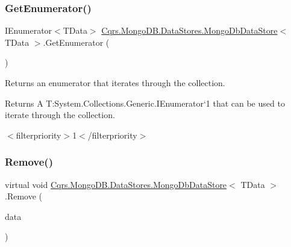\mbox{\label{classCqrs_1_1MongoDB_1_1DataStores_1_1MongoDbDataStore_a2bab987d4d7f3c6b2ab3a3e04878cf98_a2bab987d4d7f3c6b2ab3a3e04878cf98}} 
\subsubsection{\texorpdfstring{Get\+Enumerator()}{GetEnumerator()}}
{\footnotesize\ttfamily I\+Enumerator$<$T\+Data$>$ \hyperlink{classCqrs_1_1MongoDB_1_1DataStores_1_1MongoDbDataStore}{Cqrs.\+Mongo\+D\+B.\+Data\+Stores.\+Mongo\+Db\+Data\+Store}$<$ T\+Data $>$.Get\+Enumerator (\begin{DoxyParamCaption}{ }\end{DoxyParamCaption})}



Returns an enumerator that iterates through the collection. 

\begin{DoxyReturn}{Returns}
A T\+:\+System.\+Collections.\+Generic.\+I\+Enumerator`1 that can be used to iterate through the collection. 
\end{DoxyReturn}
$<$filterpriority$>$1$<$/filterpriority$>$ \mbox{\label{classCqrs_1_1MongoDB_1_1DataStores_1_1MongoDbDataStore_a14b43546e8d1e1832358e1cf2f8535f1_a14b43546e8d1e1832358e1cf2f8535f1}} 
\subsubsection{\texorpdfstring{Remove()}{Remove()}}
{\footnotesize\ttfamily virtual void \hyperlink{classCqrs_1_1MongoDB_1_1DataStores_1_1MongoDbDataStore}{Cqrs.\+Mongo\+D\+B.\+Data\+Stores.\+Mongo\+Db\+Data\+Store}$<$ T\+Data $>$.Remove (\begin{DoxyParamCaption}\item[{T\+Data}]{data }\end{DoxyParamCaption})\hspace{0.3cm}{\ttfamily [virtual]}}



